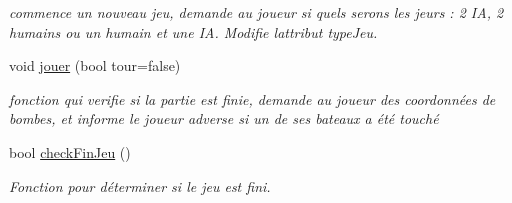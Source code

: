 \begin{DoxyCompactItemize}
\begin{DoxyCompactList}\small\item\em commence un nouveau jeu, demande au joueur si quels serons les jeurs \+: 2 IA, 2 humains ou un humain et une IA. Modifie l\textquotesingle{}attribut type\+Jeu. \end{DoxyCompactList}\item 
void \hyperlink{class_jeu_bataille_navale_afcddb891c010b0cd4551b2a99e0490c4}{jouer} (bool tour=false)
\begin{DoxyCompactList}\small\item\em fonction qui verifie si la partie est finie, demande au joueur des coordonnées de bombes, et informe le joueur adverse si un de ses bateaux a été touché \end{DoxyCompactList}\item 
bool \hyperlink{class_jeu_bataille_navale_ad23d49de0aee0b1b182c96a22cb42ffb}{check\+Fin\+Jeu} ()
\begin{DoxyCompactList}\small\item\em Fonction pour déterminer si le jeu est fini. \end{DoxyCompactList}\end{DoxyCompactItemize}
